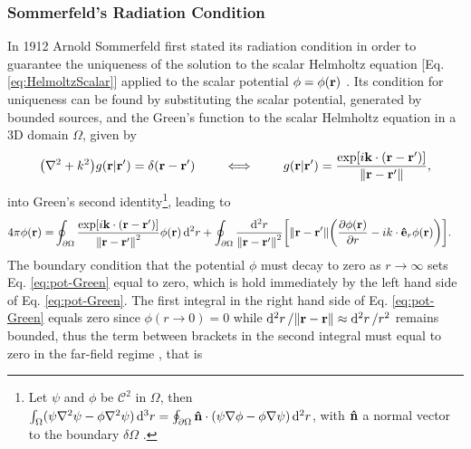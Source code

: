 


\subsubsection{Sommerfeld's Radiation Condition}

In 1912 Arnold Sommerfeld first stated its radiation condition in order to guarantee the uniqueness of the solution to the scalar Helmholtz equation [Eq. \eqref{eq:HelmoltzScalar}] applied to the scalar potential $\phi = \phi(\vb{r})$ \cite{schot_eighty_1992}. Its condition for uniqueness can be found by substituting the scalar potential, generated by bounded sources, and the Green's function to the scalar Helmholtz equation in a 3D domain $\Omega$, given by \cite{zangwill_modern_2013,jackson_classical_1999}
%
%
%
%
%
\begin{align}
    \qty(\nabla^2 + k^2) g(\vb{r}|\vb{r}')   = \delta(\vb{r}-\vb{r}')
        \qquad
        \iff
        \qquad
    g(\vb{r}|\vb{r}')   = \frac{\exp[i\vb{k}\cdot(\vb{r}-\vb{r}')]}{\norm{\vb{r}-\vb{r}'}},
\end{align}
%
into Green's second identity\footnote{%
        Let $\psi$ and $\phi$ be $\mathcal{C}^2$ in $\Omega$, then %
        $\int_\Omega (\psi\nabla^2\psi-\phi\nabla^2\psi)\dd[3]{r} = %
        \oint_{\partial\Omega}\vu{n}\cdot(\psi\nabla\phi-\phi\nabla\psi)\dd[2]{r}$, with $\vu{n}$ a normal vector to the boundary $\delta\Omega$  \cite{zangwill_modern_2013}.}, %
 leading to
\begin{align}
    4\pi \phi(\vb{r}) =& \oint_{\partial\Omega}  \frac{\exp[i\vb{k}\cdot(\vb{r}-\vb{r}')]}{\norm{\vb{r}-\vb{r}'}^2} \phi(\vb{r}) \dd[2]{r}+
                 \oint_{\partial\Omega} \frac{\dd[2]{r}}{\norm{\vb{r}-\vb{r}'}^2} \qty[\norm{\vb{r}-\vb{r}'}\qty(\pdv{ \phi(\vb{r})}{r}-ik\cdot\vu{e}_r \phi(\vb{r})) ].
    \label{eq:pot-Green}
\end{align}
%
The boundary condition that the potential $\phi$ must decay to zero as $r\to\infty$ sets Eq. \eqref{eq:pot-Green} equal to zero, which is  hold immediately by the left hand side of Eq. \eqref{eq:pot-Green}. The first integral in the right hand side of Eq. \eqref{eq:pot-Green} equals zero since $\phi(r\to 0 ) = 0$ while $\dd[2]{r}/\norm{\vb{r}-\vb{r}}\approx\dd[2]{r}/r^2$ remains bounded, thus the term between brackets in the second integral must equal to zero in the far-field regime \cite{schot_eighty_1992}, that is
